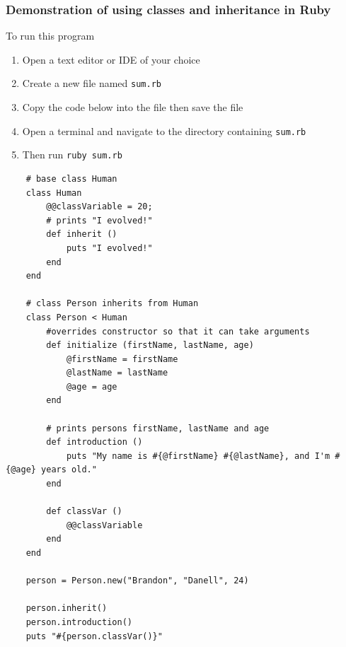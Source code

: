\documentclass{article}
\begin{document}
  \subsubsection{Demonstration of using classes and inheritance in Ruby}
  To run this program
  \begin{enumerate}
    \item Open a text editor or IDE of your choice
    \item Create a new file named \verb|sum.rb|
    \item Copy the code below into the file then save the file
    \item Open a terminal and navigate to the directory containing \verb|sum.rb|
    \item Then run \verb|ruby sum.rb|
  \end{enumerate}
  \begin{lstlisting}
    # base class Human
    class Human
        @@classVariable = 20;
        # prints "I evolved!"
        def inherit ()
            puts "I evolved!"
        end
    end

    # class Person inherits from Human
    class Person < Human
        #overrides constructor so that it can take arguments
        def initialize (firstName, lastName, age)
            @firstName = firstName
            @lastName = lastName
            @age = age
        end

        # prints persons firstName, lastName and age
        def introduction ()
            puts "My name is #{@firstName} #{@lastName}, and I'm #{@age} years old."
        end

        def classVar ()
            @@classVariable
        end
    end

    person = Person.new("Brandon", "Danell", 24)

    person.inherit()
    person.introduction()
    puts "#{person.classVar()}"
  \end{lstlisting}
  
\end{document}
